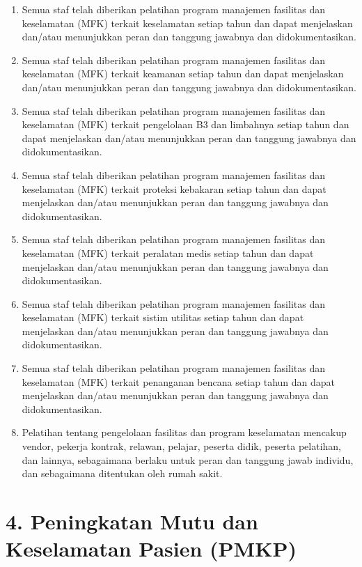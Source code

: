 \documentclass[
]{book}
\providecommand{\tightlist}{%
  \setlength{\itemsep}{0pt}\setlength{\parskip}{0pt}}
\begin{document}
\begin{enumerate}
\def\labelenumi{\alph{enumi}.}
\tightlist
\item
  Semua staf telah diberikan pelatihan program manajemen fasilitas dan keselamatan (MFK) terkait keselamatan setiap tahun dan dapat menjelaskan dan/atau menunjukkan peran dan tanggung jawabnya dan didokumentasikan.
\item
  Semua staf telah diberikan pelatihan program manajemen fasilitas dan keselamatan (MFK) terkait keamanan setiap tahun dan dapat menjelaskan dan/atau menunjukkan peran dan tanggung jawabnya dan didokumentasikan.
\item
  Semua staf telah diberikan pelatihan program manajemen fasilitas dan keselamatan (MFK) terkait pengelolaan B3 dan limbahnya setiap tahun dan dapat menjelaskan dan/atau menunjukkan peran dan tanggung jawabnya dan didokumentasikan.
\item
  Semua staf telah diberikan pelatihan program manajemen fasilitas dan keselamatan (MFK) terkait proteksi kebakaran setiap tahun dan dapat menjelaskan dan/atau menunjukkan peran dan tanggung jawabnya dan didokumentasikan.
\item
  Semua staf telah diberikan pelatihan program manajemen fasilitas dan keselamatan (MFK) terkait peralatan medis setiap tahun dan dapat menjelaskan dan/atau menunjukkan peran dan tanggung jawabnya dan didokumentasikan.
\item
  Semua staf telah diberikan pelatihan program manajemen fasilitas dan keselamatan (MFK) terkait sistim utilitas setiap tahun dan dapat menjelaskan dan/atau menunjukkan peran dan tanggung jawabnya dan didokumentasikan.
\item
  Semua staf telah diberikan pelatihan program manajemen fasilitas dan keselamatan (MFK) terkait penanganan bencana setiap tahun dan dapat menjelaskan dan/atau menunjukkan peran dan tanggung jawabnya dan didokumentasikan.
\item
  Pelatihan tentang pengelolaan fasilitas dan program keselamatan mencakup vendor, pekerja kontrak, relawan, pelajar, peserta didik, peserta pelatihan, dan lainnya, sebagaimana berlaku untuk peran dan tanggung jawab individu, dan sebagaimana ditentukan oleh rumah sakit.
\end{enumerate}

\hypertarget{peningkatan-mutu-dan-keselamatan-pasien-pmkp}{%
\section*{4. Peningkatan Mutu dan Keselamatan Pasien (PMKP)}\label{peningkatan-mutu-dan-keselamatan-pasien-pmkp}}
\end{document}
